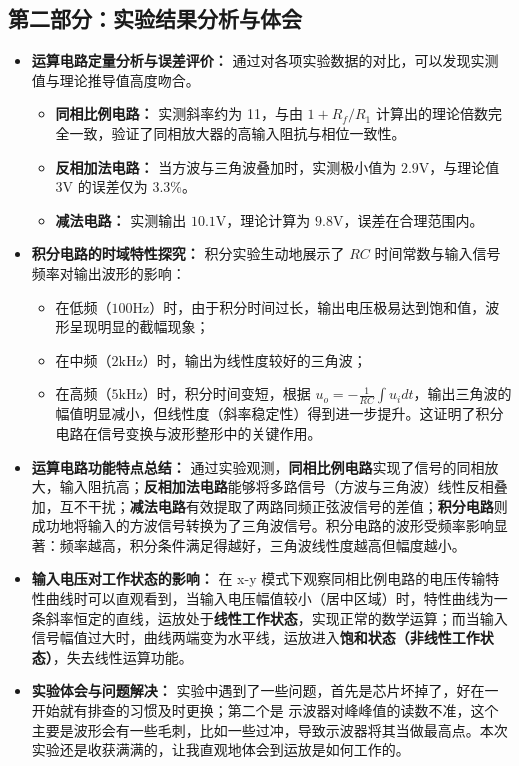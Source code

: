 ﻿\documentclass[10.5pt]{config}
\begin{document}
\subsection*{第二部分：实验结果分析与体会}
\begin{itemize}[leftmargin=2em]

        \item \textbf{运算电路定量分析与误差评价：}
        通过对各项实验数据的对比，可以发现实测值与理论推导值高度吻合。
        \begin{itemize}
            \item \textbf{同相比例电路：} 实测斜率约为 11，与由 $1+R_f/R_1$ 计算出的理论倍数完全一致，验证了同相放大器的高输入阻抗与相位一致性。
            \item \textbf{反相加法电路：} 当方波与三角波叠加时，实测极小值为 $2.9\text{V}$，与理论值 $3\text{V}$ 的误差仅为 3.3\%。
            \item \textbf{减法电路：} 实测输出 $10.1\text{V}$，理论计算为 $9.8\text{V}$，误差在合理范围内。
        \end{itemize}
    
        \item \textbf{积分电路的时域特性探究：}
        积分实验生动地展示了 $RC$ 时间常数与输入信号频率对输出波形的影响：
        \begin{itemize}
            \item 在低频（$100\mathrm{Hz}$）时，由于积分时间过长，输出电压极易达到饱和值，波形呈现明显的截幅现象；
            \item 在中频（$2\mathrm{kHz}$）时，输出为线性度较好的三角波；
            \item 在高频（$5\mathrm{kHz}$）时，积分时间变短，根据 $u_o = -\frac{1}{RC}\int u_i dt$，输出三角波的幅值明显减小，但线性度（斜率稳定性）得到进一步提升。这证明了积分电路在信号变换与波形整形中的关键作用。
        \end{itemize}


    \item \textbf{运算电路功能特点总结：}
    通过实验观测，\textbf{同相比例电路}实现了信号的同相放大，输入阻抗高；\textbf{反相加法电路}能够将多路信号（方波与三角波）线性反相叠加，互不干扰；\textbf{减法电路}有效提取了两路同频正弦波信号的差值；\textbf{积分电路}则成功地将输入的方波信号转换为了三角波信号。积分电路的波形受频率影响显著：频率越高，积分条件满足得越好，三角波线性度越高但幅度越小。
    
    \item \textbf{输入电压对工作状态的影响：}
    在 x-y 模式下观察同相比例电路的电压传输特性曲线时可以直观看到，当输入电压幅值较小（居中区域）时，特性曲线为一条斜率恒定的直线，运放处于\textbf{线性工作状态}，实现正常的数学运算；而当输入信号幅值过大时，曲线两端变为水平线，运放进入\textbf{饱和状态（非线性工作状态）}，失去线性运算功能。
    
    \item \textbf{实验体会与问题解决：}
    实验中遇到了一些问题，首先是芯片坏掉了，好在一开始就有排查的习惯及时更换；第二个是 示波器对峰峰值的读数不准，这个主要是波形会有一些毛刺，比如一些过冲，导致示波器将其当做最高点。本次实验还是收获满满的，让我直观地体会到运放是如何工作的。

\end{itemize}
\end{document}
